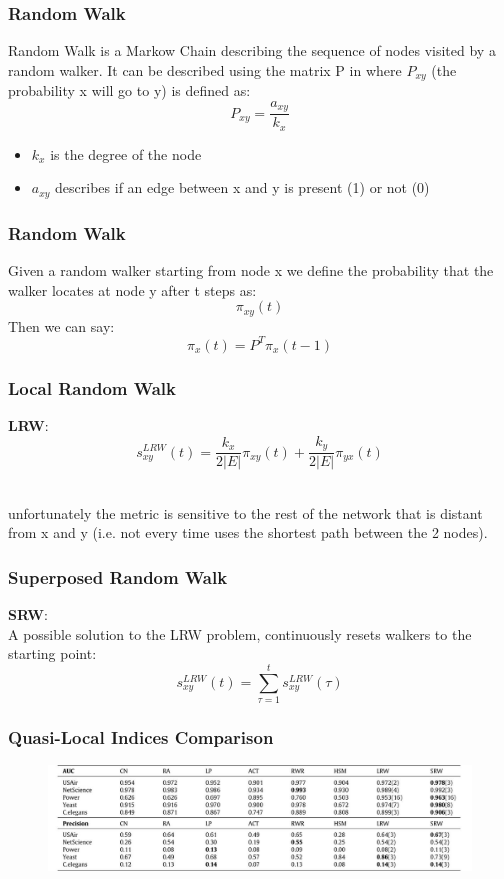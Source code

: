 \documentclass{beamer}
\begin{document}
\begin{frame}
  \frametitle{Random Walk }
  Random Walk is a Markow Chain describing the sequence of nodes visited by a random walker. It can be described using the matrix P in where $P_{xy}$ (the probability x will go to y) is defined as: \\
  \[P_{xy}=\dfrac{a_{xy}}{k_{x}}\] 
  \begin{itemize}
      \item $k_{x}$ is the degree of the node 
      \item $a_{xy}$ describes if an edge between x and y is present (1) or not (0)
  \end{itemize}
\end{frame}

\begin{frame}
  \frametitle{Random Walk}
  Given a random walker starting from node x we define the probability that the walker locates at node y after t steps as: \\
  \[\pi_{xy}(t)\]
  \bigskip
  Then we can say: 
  \[\pi_{x}(t)=P^{T}\pi_{x}(t-1)\]
  
\end{frame}

\begin{frame}
  \frametitle{Local Random Walk}
  \textbf{LRW}: \\
  \[s_{xy}^{LRW}(t) =\dfrac{k_{x}}{2|E|}\pi_{xy}(t) + \dfrac{k_{y}}{2|E|}\pi_{yx}(t)\]\\
  \bigskip
  \bigskip
  
  \color{red}\color{black} unfortunately the metric is sensitive to the rest of the network that is distant from x and y (i.e. not every time uses the shortest path between the 2 nodes).\\
\end{frame}

\begin{frame}
  \frametitle{Superposed Random Walk}
  \textbf{SRW}:\\ 
  A possible solution to the LRW problem, continuously resets walkers to the starting point: \\
  \bigskip
  \[s_{xy}^{LRW}(t) = \sum_{\tau=1}^{t}s_{xy}^{LRW}(\tau)\]
\end{frame}

\begin{frame}
\frametitle{Quasi-Local Indices Comparison}
\begin{figure}
  \centering
  \includegraphics[width=1\linewidth]{andrea_images/table2.jpg}
  \label{fig:table2}
\end{figure}
\end{frame}
\end{document}
